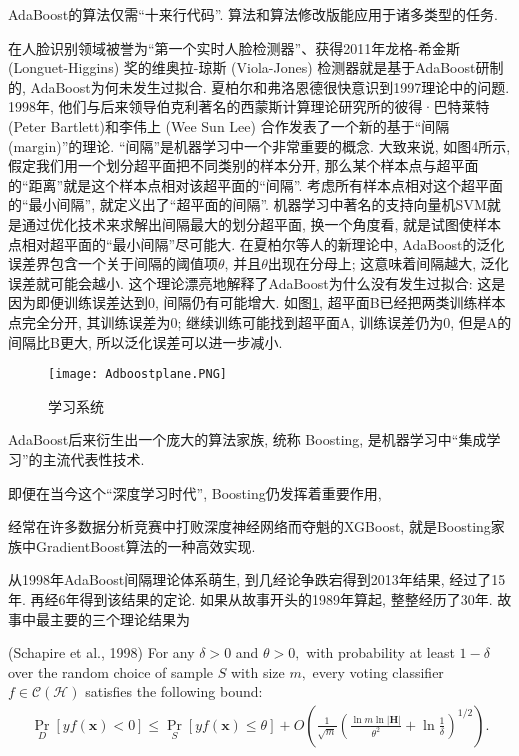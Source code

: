 AdaBoost的算法仅需“十来行代码”.  算法和算法修改版能应用于诸多类型的任务.
\begin{example}
在人脸识别领域被誉为“第一个实时人脸检测器”、获得2011年龙格-希金斯 (Longuet-Higgins) 奖的维奥拉-琼斯 (Viola-Jones) 检测器就是基于AdaBoost研制的, AdaBoost为何未发生过拟合. 
夏柏尔和弗洛恩德很快意识到1997理论中的问题. 1998年, 他们与后来领导伯克利著名的西蒙斯计算理论研究所的彼得·巴特莱特(Peter Bartlett)和李伟上 (Wee Sun Lee) 合作发表了一个新的基于“间隔(margin)”的理论.
“间隔”是机器学习中一个非常重要的概念. 大致来说, 如图4所示, 假定我们用一个划分超平面把不同类别的样本分开, 那么某个样本点与超平面的“距离”就是这个样本点相对该超平面的“间隔”. 
考虑所有样本点相对这个超平面的“最小间隔”, 就定义出了“超平面的间隔”.
机器学习中著名的支持向量机SVM就是通过优化技术来求解出间隔最大的划分超平面, 换一个角度看, 就是试图使样本点相对超平面的“最小间隔”尽可能大.
在夏柏尔等人的新理论中, AdaBoost的泛化误差界包含一个关于间隔的阈值项$\theta$, 并且$\theta$出现在分母上; 这意味着间隔越大, 泛化误差就可能会越小.
这个理论漂亮地解释了AdaBoost为什么没有发生过拟合:
这是因为即便训练误差达到0, 间隔仍有可能增大. 如图\ref{AI32Adboostplane}, 超平面B已经把两类训练样本点完全分开, 其训练误差为0;
继续训练可能找到超平面A, 训练误差仍为0, 但是A的间隔比B更大, 所以泛化误差可以进一步减小.
\begin{figure}[H]
    \begin{center}
    \texttt{[image: Adboostplane.PNG]}
    \end{center}
    \caption{学习系统}
    \label{AI32Adboostplane}
\end{figure}

AdaBoost后来衍生出一个庞大的算法家族, 统称 Boosting, 是机器学习中“集成学习”的主流代表性技术.   
\end{example}
即便在当今这个“深度学习时代”, Boosting仍发挥着重要作用,
\begin{example}
    经常在许多数据分析竞赛中打败深度神经网络而夺魁的XGBoost, 就是Boosting家族中GradientBoost算法的一种高效实现. 
\end{example}

从1998年AdaBoost间隔理论体系萌生, 到几经论争跌宕得到2013年结果, 经过了15年. 
再经6年得到该结果的定论. 如果从故事开头的1989年算起, 整整经历了30年. 故事中最主要的三个理论结果为
\begin{mythm}{(Schapire et al., 1998)}{}\label{AIthm7.1}
For any $\delta>0$ and $\theta>0,$ with probability at least $1-\delta$ over the random choice of sample $S$ with size $m,$ every voting classifier $f \in \mathcal{C}(\mathcal{H})$ satisfies the following bound:
\begin{align}
    \operatorname{Pr}_{D}[y f(\boldsymbol{x})<0] \leq \operatorname{Pr}_{S}[y f(\boldsymbol{x}) \leq \theta]+O\left(\frac{1}{\sqrt{m}}\left(\frac{\ln m \ln |\boldsymbol{H}|}{\theta^{2}}+\ln \frac{1}{\delta}\right)^{1 / 2}\right).
\end{align}
\end{mythm}


